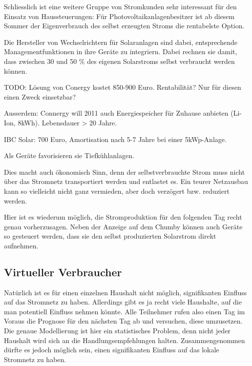 \documentclass[12pt,BCOR=8.5mm]{scrartcl}
\begin{document}
Schliesslich ist eine weitere Gruppe von Stromkunden sehr interessant
für den Einsatz von Haussteuerungen: Für Photovoltaikanlagenbesitzer ist ab
diesem Sommer der Eigenverbrauch des selbst erzeugten Stroms die
rentabelste Option.

Die Hersteller von Wechselrichtern für Solaranlagen sind dabei,
entsprechende Managementfunktionen in ihre Geräte zu integriern. Dabei
rechnen sie damit, dass zwischen 30 und 50 \% des eigenen Solarstroms
selbst verbraucht werden können\cite{ossenbrinck10herstellung}.

TODO: Lösung von Conergy kostet 850-900 Euro. Rentabilität? Nur für
diesen einen Zweck einsetzbar?

Ausserdem: Connergy will 2011 auch Energiespeicher für Zuhause anbieten
(Li-Ion, 8kWh). Lebensdauer > 20 Jahre.

IBC Solar: 700 Euro, Amortisation nach 5-7 Jahre bei einer 5kWp-Anlage.

Als Geräte favorisieren sie Tiefkühlanlagen.

Dies macht auch
ökonomisch Sinn, denn der selbstverbrauchte Strom muss nicht über das
Stromnetz transportiert werden und entlastet es. Ein teurer Netzausbau
kann so vielleicht nicht ganz vermieden, aber doch verzögert bzw.
reduziert werden.

Hier ist es wiederum möglich, die Stromproduktion für den folgenden Tag
recht genau vorherzusagen. Neben der Anzeige auf dem Chumby können auch
Geräte so gesteuert werden, dass sie den selbst produzierten Solarstrom
direkt aufnehmen.

\subsection{Virtueller Verbraucher}\label{sub:virtuellerverbraucher}
Natürlich ist es für einen einzelnen Haushalt nicht möglich,
signifikanten Einfluss auf das Stromnetz zu haben. Allerdings gibt es ja
recht viele Haushalte, auf die man potentiell Einfluss nehmen könnte.
Alle Teilnehmer rufen also einen Tag im Voraus die Prognose für den
nächsten Tag ab und versuchen, diese umzusetzen. Die genaue Modellierung
ist hier ein statistisches Problem, denn nicht jeder Haushalt wird sich
an die Handlungsempfehlungen halten. Zusammengenommen dürfte es jedoch
möglich sein, einen signifikanten Einfluss auf das lokale Stromnetz zu
haben.
\end{document}
